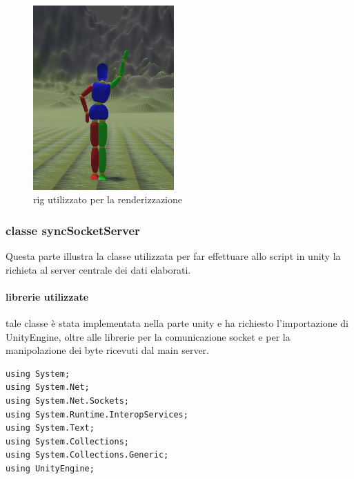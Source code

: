 \documentclass[10pt,a4paper]{article}
\begin{document}
\begin{figure}[h!]
  	\centering
    \includegraphics[height=200pt]{dummy.PNG}
    \caption{rig utilizzato per la renderizzazione}
\end{figure}

\subsubsection{classe syncSocketServer}
Questa parte illustra la classe utilizzata per far effettuare allo script in unity la richieta al server centrale dei dati elaborati.

\paragraph{librerie utilizzate}
tale classe è stata implementata nella parte unity e ha richiesto l'importazione di UnityEngine, oltre alle librerie per la comunicazione socket e per la manipolazione dei byte ricevuti dal main server. 
\begin{lstlisting}[style=mycsharp, caption=librerie class client C\#, captionpos=b]
using System;
using System.Net;
using System.Net.Sockets;
using System.Runtime.InteropServices;
using System.Text;
using System.Collections;
using System.Collections.Generic;
using UnityEngine;

\end{lstlisting}
\end{document}

